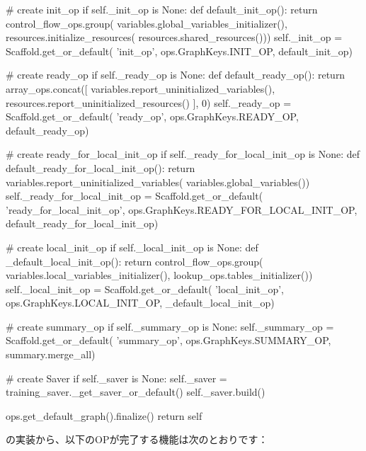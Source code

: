 \begin{content}
\begin{leftbar}
\begin{python}
    # create init\_op
    if self._init_op is None:
      def default_init_op():
        return control_flow_ops.group(
            variables.global_variables_initializer(),
            resources.initialize_resources(
              resources.shared_resources()))
      self._init_op = Scaffold.get_or_default(
          'init_op',
          ops.GraphKeys.INIT_OP,
          default_init_op)

    # create ready\_op
    if self._ready_op is None:
      def default_ready_op():
        return array_ops.concat([
            variables.report_uninitialized_variables(),
            resources.report_uninitialized_resources()
        ], 0)
      self._ready_op = Scaffold.get_or_default(
          'ready_op', 
          ops.GraphKeys.READY_OP,
          default_ready_op)
    
    # create ready\_for\_local\_init\_op
    if self._ready_for_local_init_op is None:
      def default_ready_for_local_init_op():
        return variables.report_uninitialized_variables(
            variables.global_variables())
      self._ready_for_local_init_op = Scaffold.get_or_default(
          'ready_for_local_init_op',
          ops.GraphKeys.READY_FOR_LOCAL_INIT_OP,
          default_ready_for_local_init_op)
    
    # create local\_init\_op
    if self._local_init_op is None:
      def _default_local_init_op():
        return control_flow_ops.group(
            variables.local_variables_initializer(),
            lookup_ops.tables_initializer())
      self._local_init_op = Scaffold.get_or_default(
          'local_init_op',
          ops.GraphKeys.LOCAL_INIT_OP,
          _default_local_init_op)
    
    # create summary\_op
    if self._summary_op is None:
      self._summary_op = Scaffold.get_or_default(
          'summary_op',
          ops.GraphKeys.SUMMARY_OP,
          summary.merge_all)
    
    # create Saver
    if self._saver is None:
      self._saver = training_saver._get_saver_or_default()
    self._saver.build()

    ops.get_default_graph().finalize()
    return self
\end{python}
\end{leftbar}

の実装から、以下のOPが完了する機能は次のとおりです：

\begin{enum}
\end{enum}


\end{content}
